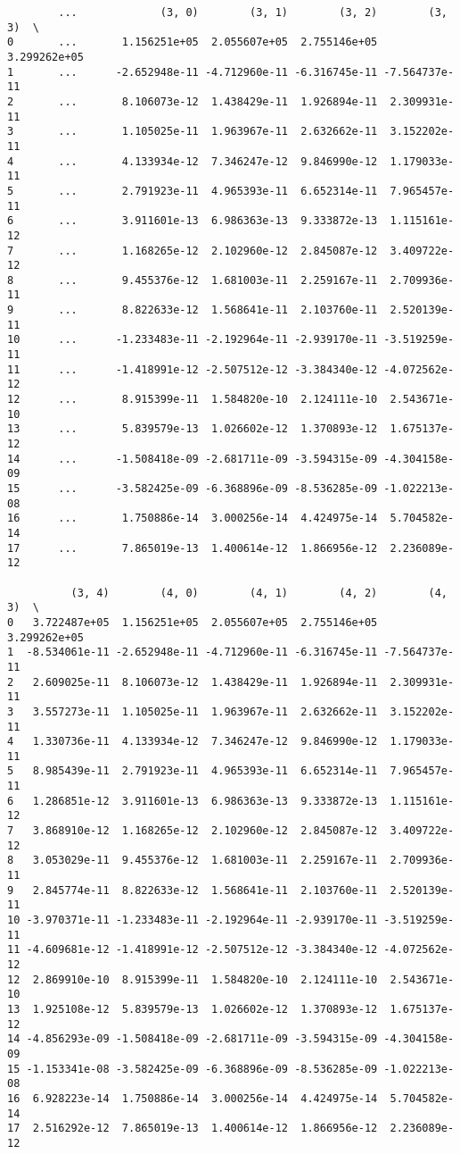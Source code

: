\documentclass[11pt]{article}
\begin{document}
\begin{verbatim}
        ...             (3, 0)        (3, 1)        (3, 2)        (3, 3)  \
0       ...       1.156251e+05  2.055607e+05  2.755146e+05  3.299262e+05   
1       ...      -2.652948e-11 -4.712960e-11 -6.316745e-11 -7.564737e-11   
2       ...       8.106073e-12  1.438429e-11  1.926894e-11  2.309931e-11   
3       ...       1.105025e-11  1.963967e-11  2.632662e-11  3.152202e-11   
4       ...       4.133934e-12  7.346247e-12  9.846990e-12  1.179033e-11   
5       ...       2.791923e-11  4.965393e-11  6.652314e-11  7.965457e-11   
6       ...       3.911601e-13  6.986363e-13  9.333872e-13  1.115161e-12   
7       ...       1.168265e-12  2.102960e-12  2.845087e-12  3.409722e-12   
8       ...       9.455376e-12  1.681003e-11  2.259167e-11  2.709936e-11   
9       ...       8.822633e-12  1.568641e-11  2.103760e-11  2.520139e-11   
10      ...      -1.233483e-11 -2.192964e-11 -2.939170e-11 -3.519259e-11   
11      ...      -1.418991e-12 -2.507512e-12 -3.384340e-12 -4.072562e-12   
12      ...       8.915399e-11  1.584820e-10  2.124111e-10  2.543671e-10   
13      ...       5.839579e-13  1.026602e-12  1.370893e-12  1.675137e-12   
14      ...      -1.508418e-09 -2.681711e-09 -3.594315e-09 -4.304158e-09   
15      ...      -3.582425e-09 -6.368896e-09 -8.536285e-09 -1.022213e-08   
16      ...       1.750886e-14  3.000256e-14  4.424975e-14  5.704582e-14   
17      ...       7.865019e-13  1.400614e-12  1.866956e-12  2.236089e-12   

          (3, 4)        (4, 0)        (4, 1)        (4, 2)        (4, 3)  \
0   3.722487e+05  1.156251e+05  2.055607e+05  2.755146e+05  3.299262e+05   
1  -8.534061e-11 -2.652948e-11 -4.712960e-11 -6.316745e-11 -7.564737e-11   
2   2.609025e-11  8.106073e-12  1.438429e-11  1.926894e-11  2.309931e-11   
3   3.557273e-11  1.105025e-11  1.963967e-11  2.632662e-11  3.152202e-11   
4   1.330736e-11  4.133934e-12  7.346247e-12  9.846990e-12  1.179033e-11   
5   8.985439e-11  2.791923e-11  4.965393e-11  6.652314e-11  7.965457e-11   
6   1.286851e-12  3.911601e-13  6.986363e-13  9.333872e-13  1.115161e-12   
7   3.868910e-12  1.168265e-12  2.102960e-12  2.845087e-12  3.409722e-12   
8   3.053029e-11  9.455376e-12  1.681003e-11  2.259167e-11  2.709936e-11   
9   2.845774e-11  8.822633e-12  1.568641e-11  2.103760e-11  2.520139e-11   
10 -3.970371e-11 -1.233483e-11 -2.192964e-11 -2.939170e-11 -3.519259e-11   
11 -4.609681e-12 -1.418991e-12 -2.507512e-12 -3.384340e-12 -4.072562e-12   
12  2.869910e-10  8.915399e-11  1.584820e-10  2.124111e-10  2.543671e-10   
13  1.925108e-12  5.839579e-13  1.026602e-12  1.370893e-12  1.675137e-12   
14 -4.856293e-09 -1.508418e-09 -2.681711e-09 -3.594315e-09 -4.304158e-09   
15 -1.153341e-08 -3.582425e-09 -6.368896e-09 -8.536285e-09 -1.022213e-08   
16  6.928223e-14  1.750886e-14  3.000256e-14  4.424975e-14  5.704582e-14   
17  2.516292e-12  7.865019e-13  1.400614e-12  1.866956e-12  2.236089e-12   


\end{verbatim}
\end{document}
